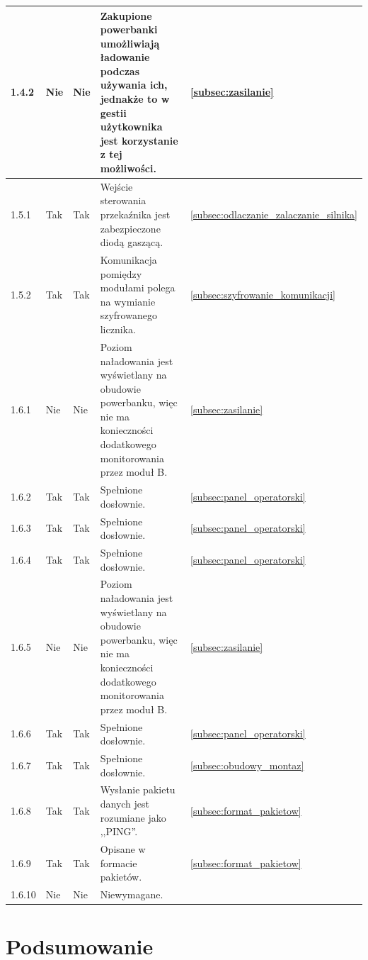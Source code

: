 \begin{longtable}{p{} p{} p{} p{} p{}}
1.4.2 & Nie & Nie & Zakupione powerbanki umożliwiają ładowanie podczas używania ich, jednakże to w gestii użytkownika jest korzystanie z tej możliwości. & \ref{subsec:zasilanie} \\ \hline
1.5.1 & Tak & Tak & Wejście sterowania przekaźnika jest zabezpieczone diodą gaszącą. & \ref{subsec:odlaczanie_zalaczanie_silnika} \\ \hline  %
1.5.2 & Tak & Tak & Komunikacja pomiędzy modułami polega na wymianie szyfrowanego licznika. & \ref{subsec:szyfrowanie_komunikacji} \\ \hline
1.6.1 & Nie & Nie & Poziom naładowania jest wyświetlany na obudowie powerbanku, więc nie ma konieczności dodatkowego monitorowania przez moduł B. & \ref{subsec:zasilanie} \\ \hline
1.6.2 & Tak & Tak & Spełnione dosłownie. & \ref{subsec:panel_operatorski} \\ \hline
1.6.3 & Tak & Tak & Spełnione dosłownie. & \ref{subsec:panel_operatorski} \\ \hline
1.6.4 & Tak & Tak & Spełnione dosłownie. & \ref{subsec:panel_operatorski} \\ \hline
1.6.5 & Nie & Nie & Poziom naładowania jest wyświetlany na obudowie powerbanku, więc nie ma konieczności dodatkowego monitorowania przez moduł B. & \ref{subsec:zasilanie} \\ \hline
1.6.6 & Tak & Tak & Spełnione dosłownie. & \ref{subsec:panel_operatorski} \\ \hline
1.6.7 & Tak & Tak & Spełnione dosłownie. & \ref{subsec:obudowy_montaz} \\ \hline
1.6.8 & Tak & Tak & Wysłanie pakietu danych jest rozumiane jako ,,PING''. & \ref{subsec:format_pakietow} \\ \hline
1.6.9 & Tak & Tak & Opisane w formacie pakietów. & \ref{subsec:format_pakietow} \\ \hline
1.6.10 & Nie & Nie & Niewymagane. &  \\ \hline

\bottomrule
\end{longtable}


\section{Podsumowanie}
\label{sec:podsumowanie_specyfikacja_projektu}


